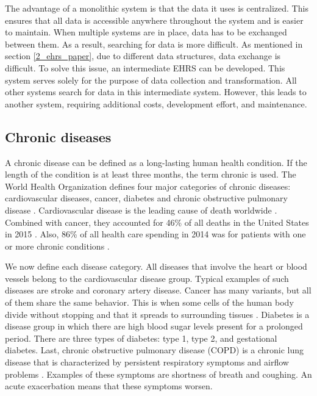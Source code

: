         The advantage of a monolithic system is that the data it uses is centralized. This ensures that all data is accessible anywhere throughout the system and is easier to maintain. When multiple systems are in place, data has to be exchanged between them. As a result, searching for data is more difficult. As mentioned in section \ref{2_ehrs_paper}, due to different data structures, data exchange is difficult. To solve this issue, an intermediate EHRS can be developed. This system serves solely for the purpose of data collection and transformation. All other systems search for data in this intermediate system. However, this leads to another system, requiring additional costs, development effort, and maintenance.
    
    \subsection{Chronic diseases} \label{chronic_diseases}
    A chronic disease can be defined as a long-lasting human health condition. If the length of the condition is at least three months, the term chronic is used. The World Health Organization defines four major categories of chronic diseases: cardiovascular diseases, cancer, diabetes and chronic obstructive pulmonary disease \cite{world2017noncommunicable}. Cardiovascular disease is the leading cause of death worldwide \cite{mendis2011global}. Combined with cancer, they accounted for 46\% of all deaths in the United States in 2015 \cite{national2016health}. Also, 86\% of all health care spending in 2014 was for patients with one or more chronic conditions \cite{gerteis2014multiple}.

    We now define each disease category. All diseases that involve the heart or blood vessels belong to the cardiovascular disease group. Typical examples of such diseases are stroke and coronary artery disease. Cancer has many variants, but all of them share the same behavior. This is when some cells of the human body divide without stopping and that it spreads to surrounding tissues \cite{cancer_def}. Diabetes is a disease group in which there are high blood sugar levels present for a prolonged period. There are three types of diabetes: type 1, type 2, and gestational diabetes. Last, chronic obstructive pulmonary disease (COPD) is a chronic lung disease that is characterized by persistent respiratory symptoms and airflow problems \cite{vogelmeier2017global}. Examples of these symptoms are shortness of breath and coughing. An acute exacerbation means that these symptoms worsen.
    
